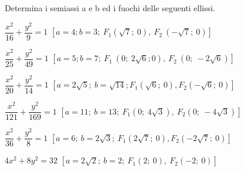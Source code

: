 \begin{esercizio}
  \label{ese:div.003}
  Determina i semiassi a e b ed i fuochi delle seguenti ellissi.
  \begin{enumeratea}
    \item \(\dfrac{x^{2}}{16} + \dfrac{y^{2}}{9} =1\) 
    \hfill
      \(\left[a=4; b=3;~F_{1} \left( 
\sqrt{7};~0\right),~F_{2}~\left(- \sqrt{7};~0\right)\right]\)
    \item \( \dfrac{x^{2}}{25} + \dfrac{y^{2}}{49} =1\)  
    \hfill
      \(\left[a=5; b=7;~F_{1}~
\left(0;~2 \sqrt{6};0\right),~F_{2}~\left(0;~-2 \sqrt{6}\right)\right]\)
      \item \( \dfrac{x^{2}}{20} + \dfrac{y^{2}}{14} =1\)
      \hfill \(\left[a=2 \sqrt{5} ;~ b= \sqrt{14} ;  F_{1}  
\left(\sqrt{6} ;~ 0\right),  F_{2}  \left(-\sqrt{6} ;~0\right)\right]\)
      \item \( \dfrac{x^{2}}{121} + \dfrac{y^{2}}{169} =1\)
      \hfill \(\left[a=11 ;~b=13 ;~
F_{1} \left(0;~4 \sqrt{3}\right),~F_{2}\left(0;~-4 \sqrt{3}\right)\right]\)
      \item \( \dfrac{x^{2}}{36} + \dfrac{y^{2}}{8} =1\)
      \hfill \(\left[a=6 ;~b=2 \sqrt{3}  ;~F_{1}  \left(2 \sqrt{7} 
;~0\right),  F_{2}  \left(-2 \sqrt{7} ;~0\right)\right]\)
      
      \item  \(4 {x^{2}} +{8y^{2}} =32\)
      \hfill \(\left[a=2 \sqrt{2}  ;~b=2 ;  ~F_{1}  (2;~0), ~ F_{2}  
(-2;~ 0)\right]\)
  \end{enumeratea}
\end{esercizio}

